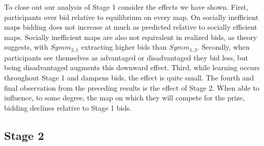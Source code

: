 \documentclass[AER]{AEA}
\begin{document}
To close out our analysis of Stage 1 consider the effects we have shown. First, participants over bid relative to equilibrium on every map. On socially inefficient maps bidding does not increase at much as predicted relative to socially efficient maps. Socially inefficient maps are also not equivalent in realized bids, as theory suggests, with $Symm_{3,1}$ extracting higher bids than $Symm_{1,3}$. Secondly, when participants see themselves as advantaged or disadvantaged they bid less, but being disadvantaged augments this downward effect. Third, while learning occurs throughout Stage 1 and dampens bids, the effect is quite small. The fourth and final observation from the preceding results is the effect of Stage 2. When able to influence, to some degree, the map on which they will compete for the prize, bidding declines relative to Stage 1 bids.

\subsection{Stage 2}
\label{subsection:Stage_2}
\end{document}
